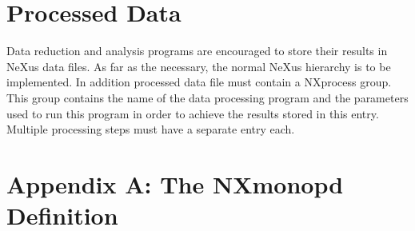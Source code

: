 \documentclass[a4paper]{article}\usepackage[dvips]{graphicx}
\begin{document}
\section{Processed Data }

Data reduction and analysis programs are encouraged to store their results in NeXus data files. 
As far as the necessary, the normal NeXus hierarchy is to  be implemented. In addition processed 
data file must contain a NXprocess group. This group contains the name of the data processing program 
and the parameters used to run this program in order to achieve the results stored in this entry. Multiple 
processing steps must have a separate entry each. 



\section{Appendix A: The NXmonopd Definition }
\end{document}
